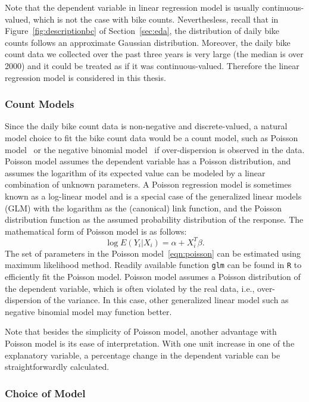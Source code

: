\documentclass [11pt, proquest] {uwthesis}[2015/03/03]
\begin{document}
Note that the dependent variable in linear regression model is usually continuous-valued, which is not the case with bike counts. Neverthesless, recall that in Figure~\ref{fig:descriptionbc} of Section~\ref{sec:eda}, the distribution of daily bike counts follows an approximate Gaussian distribution. Moreover, the daily bike count data we collected over the past three years is very large (the median is over 2000) and it could be treated as if it was continuous-valued. Therefore the linear regression model is considered in this thesis. 

\subsubsection{\textbf{Count Models}}
Since the daily bike count data is non-negative and discrete-valued, a natural model choice to fit the bike count data would be a count model, such as Poisson model~\cite{Niemeier:1996aa} or the negative binomial model~\cite{PeterWeiran16} if over-dispersion is observed in the data. Poisson model assumes the dependent variable has a Poisson distribution, and assumes the logarithm of its expected value can be modeled by a linear combination of unknown parameters. A Poisson regression model is sometimes known as a log-linear model and is a special case of the generalized linear models (GLM) with the logarithm as the (canonical) link function, and the Poisson distribution function as the assumed probability distribution of the response. The mathematical form of Poisson model is as follows:
\begin{equation}
\log E(Y_i|X_i) = \alpha + X_i^T \beta. \label{eqn:poisson}
\end{equation}
The set of parameters in the Poisson model~\eqref{eqn:poisson} can be estimated using maximum likelihood method. Readily available function \texttt{glm} can be found in \texttt{R} to efficiently fit the Poisson model. Poisson model assumes a Poisson distribution of the dependent variable, which is often violated by the real data, i.e., over-dispersion of the variance. In this case, other generalized linear model such as negative binomial model may function better.

Note that besides the simplicity of Poisson model, another advantage with Poisson model is its ease of interpretation. With one unit increase in one of the explanatory variable, a percentage change in the dependent variable can be straightforwardly calculated. 

\subsubsection{\textbf{Choice of Model}}
\label{sec:choiceofmodel}
\end{document}
